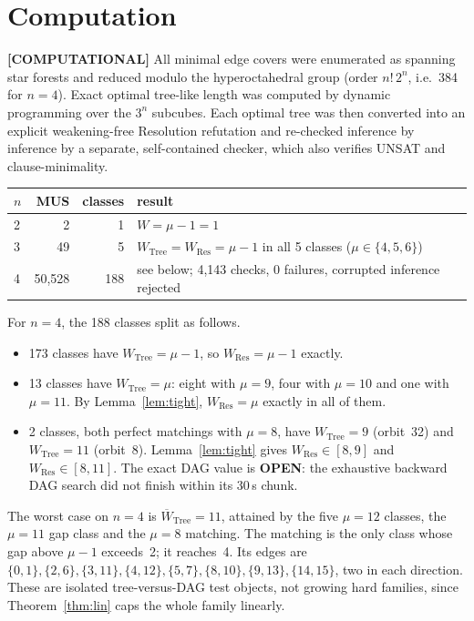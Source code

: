 \documentclass[11pt]{article}
\theoremstyle{remark}
\newcommand{\status}[1]{\textbf{[#1]}}
\newcommand{\Wb}{\overline W}
\begin{document}
\section{Computation}
\status{COMPUTATIONAL} All minimal edge covers were enumerated as spanning star forests and reduced
modulo the hyperoctahedral group (order $n!\,2^n$, i.e.\ 384 for $n=4$). Exact optimal tree-like
length was computed by dynamic programming over the $3^n$ subcubes. Each optimal tree was then
converted into an explicit weakening-free Resolution refutation and re-checked inference by inference
by a separate, self-contained checker, which also verifies UNSAT and clause-minimality.
\begin{center}\begin{tabular}{lrrl}
$n$ & MUS & classes & result\\\hline
2 & 2 & 1 & $W=\mu-1=1$\\
3 & 49 & 5 & $W_{\mathrm{Tree}}=W_{\mathrm{Res}}=\mu-1$ in all 5 classes ($\mu\in\{4,5,6\}$)\\
4 & 50{,}528 & 188 & see below; 4{,}143 checks, 0 failures, corrupted inference rejected
\end{tabular}\end{center}
For $n=4$, the 188 classes split as follows.
\begin{itemize}
\item 173 classes have $W_{\mathrm{Tree}}=\mu-1$, so $W_{\mathrm{Res}}=\mu-1$ exactly.
\item 13 classes have $W_{\mathrm{Tree}}=\mu$: eight with $\mu=9$, four with $\mu=10$ and one with
$\mu=11$. By Lemma~\ref{lem:tight}, $W_{\mathrm{Res}}=\mu$ exactly in all of them.
\item 2 classes, both perfect matchings with $\mu=8$, have $W_{\mathrm{Tree}}=9$ (orbit~32) and
$W_{\mathrm{Tree}}=11$ (orbit~8). Lemma~\ref{lem:tight} gives $W_{\mathrm{Res}}\in[8,9]$ and
$W_{\mathrm{Res}}\in[8,11]$. The exact DAG value is \textbf{OPEN}: the exhaustive backward DAG search
did not finish within its 30\,s chunk.
\end{itemize}
The worst case on $n=4$ is $\Wb_{\mathrm{Tree}}=11$, attained by the five $\mu=12$ classes, the
$\mu=11$ gap class and the $\mu=8$ matching. The matching is the only class whose gap above $\mu-1$
exceeds~2; it reaches~4. Its edges are $\{0,1\},\{2,6\},\{3,11\},\{4,12\},\{5,7\},\{8,10\},\{9,13\},\{14,15\}$,
two in each direction. These are isolated tree-versus-DAG test objects, not growing hard families,
since Theorem~\ref{thm:lin} caps the whole family linearly.
\end{document}
